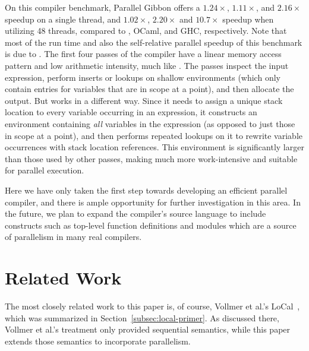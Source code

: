 \documentclass[acmsmall,acmthm=false,nonacm]{acmart}
\theoremstyle{straighttext0}
\theoremstyle{straighttext}
\newcommand{\new}[1]{#1}
\begin{document}
{\new{
On this compiler benchmark, Parallel Gibbon offers a
$1.24\times$, $1.11\times$, and $2.16\times$ speedup on a single thread, and
$1.02\times$, $2.20\times$ and $10.7\times$ speedup when utilizing 48 threads,
compared to \MPL{}, OCaml, and GHC, respectively.
%
Note that most of the run time and
also the self-relative parallel speedup of this benchmark is due to \il{assignHomes}.
%
The first four passes of the compiler have a linear memory access pattern
and low arithmetic intensity, much like \il{constFold}.
%
The passes inspect the input expression,
perform inserts or lookups on shallow environments
(which only contain entries for variables that are in scope at a point),
and then allocate the output.
%
But \il{assignHomes} works in a different way.
%
Since it needs to assign a unique stack location to every variable occurring in an expression,
it constructs an environment containing {\em all} variables in
the expression (as opposed to just those in scope at a point),
and then performs repeated lookups on it to
rewrite variable occurrences with stack location references.
%
This environment is significantly larger than those used by other passes,
making \il{assignHomes} much more work-intensive and suitable for parallel execution.

Here we have only taken the first step towards developing an efficient parallel compiler,
and there is ample opportunity for further investigation in this area.
%
In the future, we plan to expand the compiler's source language to include
constructs such as top-level function definitions and modules which
are a source of parallelism in many real compilers.
}


\section{Related Work}
\label{sec:related-work}

The most closely related work to this paper is, of course, Vollmer et al.'s LoCal~\cite{LoCal}, which was summarized in Section~\ref{subsec:local-primer}. As discussed there,
Vollmer et al.'s treatment only provided sequential semantics, while this paper
extends those semantics to incorporate parallelism.


}
\end{document}
